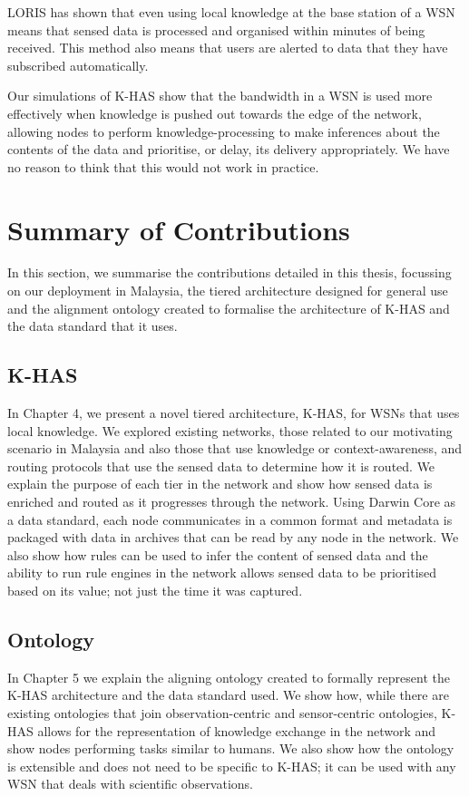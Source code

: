 LORIS has shown that even using local knowledge at the base station of a WSN means that sensed data is processed and organised within minutes of being received. This method also means that users are alerted to data that they have subscribed automatically.

Our simulations of K-HAS show that the bandwidth in a WSN is used more effectively when knowledge is pushed out towards the edge of the network, allowing nodes to perform knowledge-processing to make inferences about the contents of the data and prioritise, or delay, its delivery appropriately. We have no reason to think that this would not work in practice.


\section{Summary of Contributions}
In this section, we summarise the contributions detailed in this thesis, focussing on our deployment in Malaysia, the tiered architecture designed for general use and the alignment ontology created to formalise the architecture of K-HAS and the data standard that it uses. 
\subsection{K-HAS}
In Chapter 4, we present a novel tiered architecture, K-HAS, for WSNs that uses local knowledge. We explored existing networks, those related to our motivating scenario in Malaysia and also those that use knowledge or context-awareness, and routing protocols that use the sensed data to determine how it is routed. We explain the purpose of each tier in the network and show how sensed data is enriched and routed as it progresses through the network. Using Darwin Core as a data standard, each node communicates in a common format and metadata is packaged with data in archives that can be read by any node in the network. We also show how rules can be used to infer the content of sensed data and the ability to run rule engines in the network allows sensed data to be prioritised based on its value; not just the time it was captured.
\subsection{Ontology}
In Chapter 5 we explain the aligning ontology created to formally represent the K-HAS architecture and the data standard used. We show how, while there are existing ontologies that join observation-centric and sensor-centric ontologies, K-HAS allows for the representation of knowledge exchange in the network and show nodes performing tasks similar to humans.
We also show how the ontology is extensible and does not need to be specific to K-HAS; it can be used with any WSN that deals with scientific observations. 
